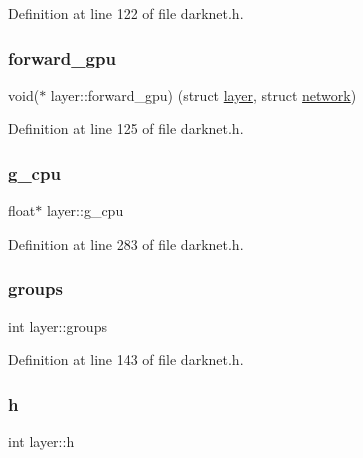Definition at line 122 of file darknet.\+h.

\mbox{\label{structlayer_ae96ac4b6c9470848c52dddc95cb14b6a}} 
\subsubsection{\texorpdfstring{forward\_gpu}{forward\_gpu}}
{\footnotesize\ttfamily void($\ast$ layer\+::forward\+\_\+gpu) (struct \mbox{\hyperlink{structlayer}{layer}}, struct \mbox{\hyperlink{structnetwork}{network}})}



Definition at line 125 of file darknet.\+h.

\mbox{\label{structlayer_abc8c1af0663167cc50b83e918e0a3c1d}} 
\subsubsection{\texorpdfstring{g\_cpu}{g\_cpu}}
{\footnotesize\ttfamily float$\ast$ layer\+::g\+\_\+cpu}



Definition at line 283 of file darknet.\+h.

\mbox{\label{structlayer_a2a7404991ccfcc0b7b884a7638d078ff}} 
\subsubsection{\texorpdfstring{groups}{groups}}
{\footnotesize\ttfamily int layer\+::groups}



Definition at line 143 of file darknet.\+h.

\mbox{\label{structlayer_a7766d090f7dac8294b7456c1251ab485}} 
\subsubsection{\texorpdfstring{h}{h}}
{\footnotesize\ttfamily int layer\+::h}



